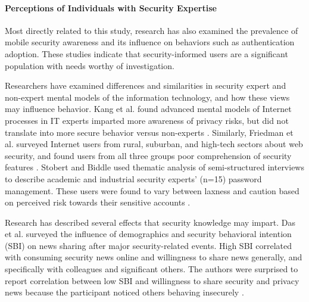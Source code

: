 \paragraph{Perceptions of Individuals with Security Expertise}
Most directly related to this study, research has also examined the prevalence of mobile security awareness and its influence on behaviors such as authentication adoption. These studies indicate that security-informed users are a significant population with needs worthy of investigation.%

%

Researchers have examined differences and similarities in security expert and non-expert mental models of the information technology, and how these views may influence behavior. Kang et al. %
found advanced mental models of Internet processes in IT experts imparted more awareness of privacy risks, but did not translate into more secure behavior versus non-experts \cite{kang2015my}. Similarly, Friedman et al. surveyed Internet users from rural, suburban, and high-tech sectors about web security, and found users from all three groups poor comprehension of security features \cite{friedman2002users}. Stobert and Biddle used thematic analysis of semi-structured interviews to describe academic and industrial security experts' (n=15) password management. These users were found to vary between laxness and caution based on perceived risk towards their sensitive accounts \cite{stobert2015expert}.

Research has described several effects that security knowledge may impart. Das et al. %
surveyed the influence of demographics and security behavioral intention (SBI) on news sharing after major security-related events. %
High SBI correlated with consuming security news online and willingness to share news generally, and specifically with colleagues and significant others. The authors were surprised to report correlation between low SBI and willingness to share security and privacy news because the participant noticed others behaving insecurely \cite{das2018breaking}.


